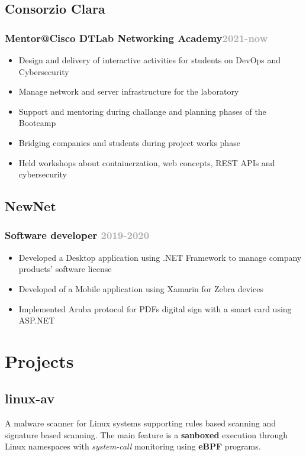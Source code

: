 \documentclass[11pt,a4paper]{article}
\begin{document}
  \subsection{Consorzio Clara}
  \subsubsection{Mentor@Cisco DTLab Networking Academy\hfill \textcolor{darkgray}{\small{2021-now}}}

  \begin{itemize}
    \item Design and delivery of interactive activities for students on DevOps and Cybersecurity
    \item Manage network and server infrastructure for the laboratory
    \item Support and mentoring during challange and planning phases of the Bootcamp
    \item Bridging companies and students during project works phase
    \item Held workshops about containerzation, web concepts, REST APIs and cybersecurity 
  \end{itemize}

  \subsection{NewNet}
  \subsubsection{Software developer \hfill \textcolor{darkgray}{\small{2019-2020}}}
  \begin{itemize}
    \item Developed a Desktop application using .NET Framework to manage company products'  software license
    \item Developed of a Mobile application using Xamarin for Zebra devices
    \item Implemented Aruba protocol for PDFs digital sign with a smart card using ASP.NET
  \end{itemize}

  \section{Projects}
  \subsection{linux-av \href{https://github.com/alarmfox/linux-av}{\faGithub}}
  A malware scanner for Linux systems supporting rules based scanning and signature based scanning. The main feature is a \textbf{sanboxed} execution through Linux namespaces with \textit{system-call} monitoring using \textbf{eBPF} programs.\\
\end{document}
